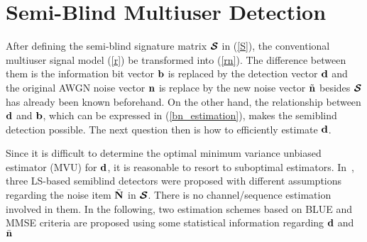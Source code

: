 \documentclass[a4paper,10pt,fleqn, twocolumn]{IEEETran}
\newcommand{\bb}{{\bf b}}
\newcommand{\bd}{{\bf d}}
\newcommand{\bn}{{\bf n}}
\newcommand{\bN}{{\bf N}}
\newcommand{\bcS}{{\mbox {\boldmath ${\cal S}$}}}
\begin{document}
\section{Semi-Blind Multiuser Detection}
After defining the semi-blind signature matrix $\bcS$ in
(\ref{S}), the conventional multiuser signal model (\ref{r}) be
transformed into (\ref{rn}). The difference between them is the
information bit vector $\bb$ is replaced by the detection vector
$\bd$ and the original AWGN noise vector $\bn$ is replace by the
new noise vector $\tilde{\bn}$ besides $\bcS$ has already been
known beforehand. On the other hand, the relationship between
$\bd$ and $\bb$, which can be expressed in (\ref{bn_estimation}),
makes the semiblind detection possible. The next question then is
how to efficiently estimate $\bd$.

Since it is difficult to determine the optimal minimum variance
unbiased estimator (MVU) for $\bd$, it is reasonable to resort to
suboptimal estimators. In~\cite{Wang03d,Wang03e}, three LS-based
semiblind detectors were proposed with different assumptions
regarding the noise item $\bar{\bN}$ in $\bcS$. There is no
channel/sequence estimation involved in them. In the following,
two estimation schemes based on BLUE and MMSE criteria are
proposed using some statistical information regarding $\bd$ and
$\bar\bn$
\end{document}
